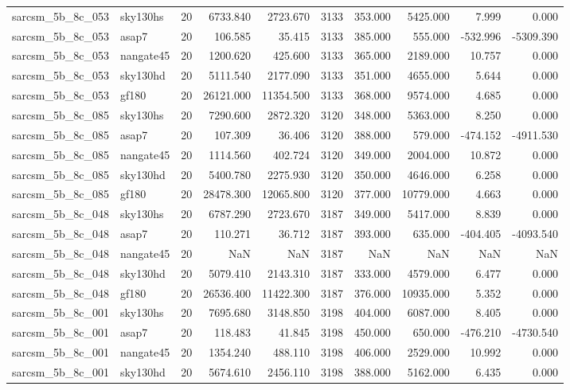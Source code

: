 \begin{tabular}{llrrrrrrrr}
sarcsm\_5b\_8c\_053 & sky130hs & 20 & 6733.840 & 2723.670 & 3133 & 353.000 & 5425.000 & 7.999 & 0.000 \\
sarcsm\_5b\_8c\_053 & asap7 & 20 & 106.585 & 35.415 & 3133 & 385.000 & 555.000 & -532.996 & -5309.390 \\
sarcsm\_5b\_8c\_053 & nangate45 & 20 & 1200.620 & 425.600 & 3133 & 365.000 & 2189.000 & 10.757 & 0.000 \\
sarcsm\_5b\_8c\_053 & sky130hd & 20 & 5111.540 & 2177.090 & 3133 & 351.000 & 4655.000 & 5.644 & 0.000 \\
sarcsm\_5b\_8c\_053 & gf180 & 20 & 26121.000 & 11354.500 & 3133 & 368.000 & 9574.000 & 4.685 & 0.000 \\
sarcsm\_5b\_8c\_085 & sky130hs & 20 & 7290.600 & 2872.320 & 3120 & 348.000 & 5363.000 & 8.250 & 0.000 \\
sarcsm\_5b\_8c\_085 & asap7 & 20 & 107.309 & 36.406 & 3120 & 388.000 & 579.000 & -474.152 & -4911.530 \\
sarcsm\_5b\_8c\_085 & nangate45 & 20 & 1114.560 & 402.724 & 3120 & 349.000 & 2004.000 & 10.872 & 0.000 \\
sarcsm\_5b\_8c\_085 & sky130hd & 20 & 5400.780 & 2275.930 & 3120 & 350.000 & 4646.000 & 6.258 & 0.000 \\
sarcsm\_5b\_8c\_085 & gf180 & 20 & 28478.300 & 12065.800 & 3120 & 377.000 & 10779.000 & 4.663 & 0.000 \\
sarcsm\_5b\_8c\_048 & sky130hs & 20 & 6787.290 & 2723.670 & 3187 & 349.000 & 5417.000 & 8.839 & 0.000 \\
sarcsm\_5b\_8c\_048 & asap7 & 20 & 110.271 & 36.712 & 3187 & 393.000 & 635.000 & -404.405 & -4093.540 \\
sarcsm\_5b\_8c\_048 & nangate45 & 20 & NaN & NaN & 3187 & NaN & NaN & NaN & NaN \\
sarcsm\_5b\_8c\_048 & sky130hd & 20 & 5079.410 & 2143.310 & 3187 & 333.000 & 4579.000 & 6.477 & 0.000 \\
sarcsm\_5b\_8c\_048 & gf180 & 20 & 26536.400 & 11422.300 & 3187 & 376.000 & 10935.000 & 5.352 & 0.000 \\
sarcsm\_5b\_8c\_001 & sky130hs & 20 & 7695.680 & 3148.850 & 3198 & 404.000 & 6087.000 & 8.405 & 0.000 \\
sarcsm\_5b\_8c\_001 & asap7 & 20 & 118.483 & 41.845 & 3198 & 450.000 & 650.000 & -476.210 & -4730.540 \\
sarcsm\_5b\_8c\_001 & nangate45 & 20 & 1354.240 & 488.110 & 3198 & 406.000 & 2529.000 & 10.992 & 0.000 \\
sarcsm\_5b\_8c\_001 & sky130hd & 20 & 5674.610 & 2456.110 & 3198 & 388.000 & 5162.000 & 6.435 & 0.000 \\

\end{tabular}
